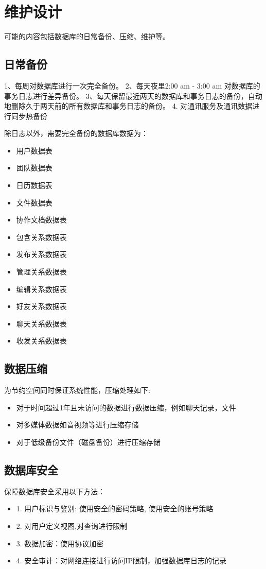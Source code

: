 \chapter{维护设计}
可能的内容包括数据库的日常备份、压缩、维护等。
\section{日常备份}
1、每周对数据库进行一次完全备份。
2、每天夜里2:00 am - 3:00 am 对数据库的事务日志进行差异备份。
3、每天保留最近两天的数据库和事务日志的备份，自动地删除久于两天前的所有数据库和事务日志的备份。
4. 对通讯服务及通讯数据进行同步热备份

除日志以外，需要完全备份的数据库数据为：
\begin{itemize}
    \item 用户数据表
    \item 团队数据表
    \item 日历数据表
    \item 文件数据表
    \item 协作文档数据表
    \item 包含关系数据表
    \item 发布关系数据表
    \item 管理关系数据表
    \item 编辑关系数据表
    \item 好友关系数据表
    \item 聊天关系数据表
    \item 收发关系数据表
\end{itemize}
\section{数据压缩}

为节约空间同时保证系统性能，压缩处理如下:
\begin{itemize}
    \item 对于时间超过1年且未访问的数据进行数据压缩，例如聊天记录，文件
    \item 对多媒体数据如音视频等进行压缩存储
    \item 对于低级备份文件（磁盘备份）进行压缩存储
\end{itemize}


\section{数据库安全}

保障数据库安全采用以下方法：
\begin{itemize}
    \item 1. 用户标识与鉴别: 使用安全的密码策略, 使用安全的账号策略
    \item 2. 对用户定义视图,对查询进行限制
    \item 3. 数据加密：使用协议加密
    \item 4. 安全审计：对网络连接进行访问IP限制，加强数据库日志的记录
\end{itemize}

